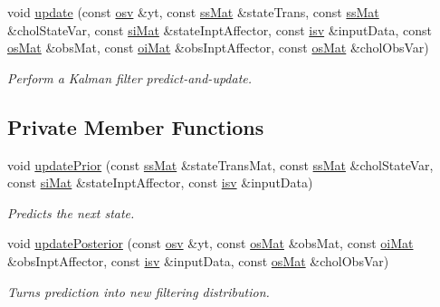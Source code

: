 \begin{DoxyCompactItemize}
void \hyperlink{classkalman_a55f914729a1d7de38a672c95b9efdaae}{update} (const \hyperlink{classkalman_a0172e54797a5d5b0acc4168894adc6d5}{osv} \&yt, const \hyperlink{classkalman_a581550d9aba33245fb496b22a834831c}{ss\+Mat} \&state\+Trans, const \hyperlink{classkalman_a581550d9aba33245fb496b22a834831c}{ss\+Mat} \&chol\+State\+Var, const \hyperlink{classkalman_ab024c795f585385ee14aea92a5dccfbc}{si\+Mat} \&state\+Inpt\+Affector, const \hyperlink{classkalman_abc570ce1b06e8a96a334f9226dfbce77}{isv} \&input\+Data, const \hyperlink{classkalman_a28ffd71604fac7b25492b1b43379e046}{os\+Mat} \&obs\+Mat, const \hyperlink{classkalman_a35298f18f0b699f700e2d55d94bf54fc}{oi\+Mat} \&obs\+Inpt\+Affector, const \hyperlink{classkalman_a28ffd71604fac7b25492b1b43379e046}{os\+Mat} \&chol\+Obs\+Var)
\begin{DoxyCompactList}\small\item\em Perform a Kalman filter predict-\/and-\/update. \end{DoxyCompactList}\end{DoxyCompactItemize}
\subsection*{Private Member Functions}
\begin{DoxyCompactItemize}
\item 
void \hyperlink{classkalman_af4a5d62ffbd478fedfb040cb9e4fcb24}{update\+Prior} (const \hyperlink{classkalman_a581550d9aba33245fb496b22a834831c}{ss\+Mat} \&state\+Trans\+Mat, const \hyperlink{classkalman_a581550d9aba33245fb496b22a834831c}{ss\+Mat} \&chol\+State\+Var, const \hyperlink{classkalman_ab024c795f585385ee14aea92a5dccfbc}{si\+Mat} \&state\+Inpt\+Affector, const \hyperlink{classkalman_abc570ce1b06e8a96a334f9226dfbce77}{isv} \&input\+Data)
\begin{DoxyCompactList}\small\item\em Predicts the next state. \end{DoxyCompactList}\item 
void \hyperlink{classkalman_acc8158a9a454f4bb96dd7f144e54f63d}{update\+Posterior} (const \hyperlink{classkalman_a0172e54797a5d5b0acc4168894adc6d5}{osv} \&yt, const \hyperlink{classkalman_a28ffd71604fac7b25492b1b43379e046}{os\+Mat} \&obs\+Mat, const \hyperlink{classkalman_a35298f18f0b699f700e2d55d94bf54fc}{oi\+Mat} \&obs\+Inpt\+Affector, const \hyperlink{classkalman_abc570ce1b06e8a96a334f9226dfbce77}{isv} \&input\+Data, const \hyperlink{classkalman_a28ffd71604fac7b25492b1b43379e046}{os\+Mat} \&chol\+Obs\+Var)
\begin{DoxyCompactList}\small\item\em Turns prediction into new filtering distribution. \end{DoxyCompactList}\end{DoxyCompactItemize}
